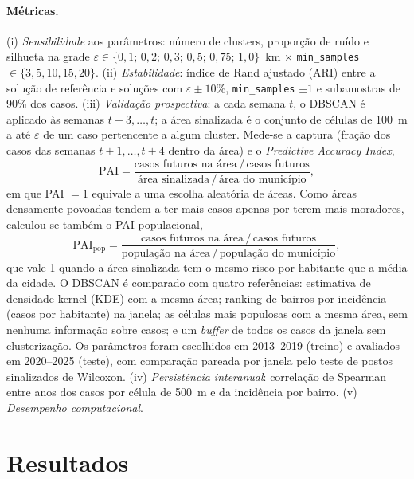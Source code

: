 \documentclass[11pt,a4paper]{article}
\begin{document}
\paragraph{Métricas.} (i) \emph{Sensibilidade} aos parâmetros: número de clusters, proporção de ruído e silhueta na
grade $\varepsilon \in \{0{,}1;\,0{,}2;\,0{,}3;\,0{,}5;\,0{,}75;\,1{,}0\}$~km $\times$ \texttt{min\_samples}
$\in \{3, 5, 10, 15, 20\}$. (ii) \emph{Estabilidade}: índice de Rand ajustado (ARI) entre a solução de referência e soluções
com $\varepsilon \pm 10\%$, \texttt{min\_samples} $\pm 1$ e subamostras de 90\% dos casos. (iii) \emph{Validação
prospectiva}: a cada semana $t$, o DBSCAN é aplicado às semanas $t-3,\dots,t$; a área sinalizada é o conjunto de células
de 100~m a até $\varepsilon$ de um caso pertencente a algum cluster. Mede-se a captura (fração dos casos das semanas
$t+1,\dots,t+4$ dentro da área) e o \emph{Predictive Accuracy Index},
\begin{equation}
  \text{PAI} = \frac{\text{casos futuros na área}\,/\,\text{casos futuros}}{\text{área sinalizada}\,/\,\text{área do município}},
\end{equation}
em que PAI $=1$ equivale a uma escolha aleatória de áreas. Como áreas densamente povoadas tendem a ter mais casos
apenas por terem mais moradores, calculou-se também o PAI populacional,
\begin{equation}
  \text{PAI}_\text{pop} = \frac{\text{casos futuros na área}\,/\,\text{casos futuros}}{\text{população na área}\,/\,\text{população do município}},
\end{equation}
que vale 1 quando a área sinalizada tem o mesmo risco por habitante que a média da cidade. O DBSCAN é comparado com
quatro referências: estimativa de densidade kernel (KDE) com a mesma área; ranking de bairros por incidência (casos
por habitante) na janela; as células mais populosas com a mesma área, sem nenhuma informação sobre casos; e um
\emph{buffer} de todos os casos da janela sem clusterização. Os parâmetros foram escolhidos em 2013--2019 (treino) e avaliados em 2020--2025 (teste),
com comparação pareada por janela pelo teste de postos sinalizados de Wilcoxon. (iv) \emph{Persistência interanual}:
correlação de Spearman entre anos dos casos por célula de 500~m e da incidência por bairro. (v) \emph{Desempenho computacional}.

\section{Resultados}
\end{document}

